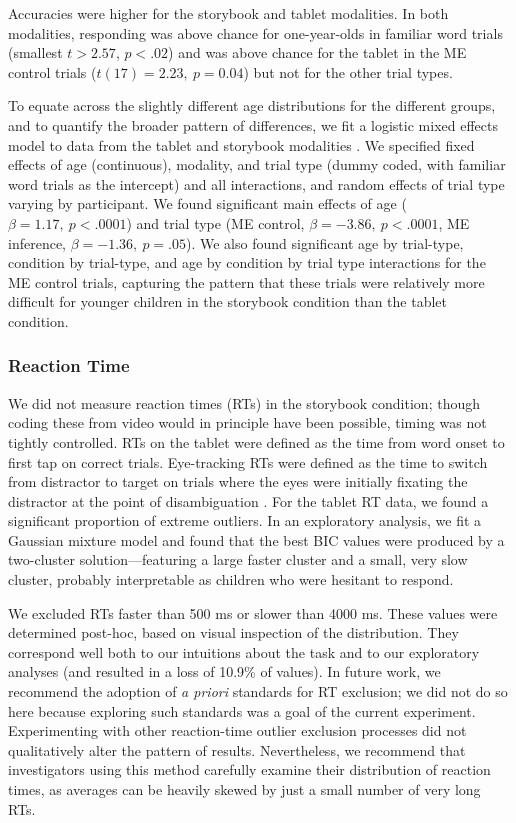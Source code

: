 \documentclass[man,noapacite]{apa2}
\begin{document}
Accuracies were higher for the storybook and tablet modalities. In both modalities, responding was above chance for one-year-olds in familiar word trials (smallest $t > 2.57$, $p < .02$) and was above chance for the tablet in the ME control trials ($t(17) = 2.23,~p = 0.04$) but not for the other trial types. 

To equate across the slightly different age distributions for the different groups, and to quantify the broader pattern of differences, we fit a logistic mixed effects model to data from the tablet and storybook modalities \cite{jaeger2008}. We specified fixed effects of age (continuous), modality, and trial type (dummy coded, with familiar word trials as the intercept) and all interactions, and random effects of trial type varying by participant. We found significant main effects of age ($\beta = 1.17,~p < .0001$) and trial type (ME control, $\beta = -3.86,~p <.0001$, ME inference, $\beta = -1.36,~p = .05$). We also found significant age by trial-type, condition by trial-type, and age by condition by trial type interactions for the ME control trials, capturing the pattern that these trials were relatively more difficult for younger children in the storybook condition than the tablet condition.

\subsubsection{Reaction Time}

We did not measure reaction times (RTs) in the storybook condition; though coding these from video would in principle have been possible, timing was not tightly controlled. RTs on the tablet were defined as the time from word onset to first tap on correct trials. Eye-tracking RTs were defined as the time to switch from distractor to target on trials where the eyes were initially fixating the distractor at the point of disambiguation \cite<for more details, see>{fernald2008}. For the tablet RT data, we found a significant proportion of extreme outliers. In an exploratory analysis, we fit a Gaussian mixture model and found that the best BIC values were produced by a two-cluster solution---featuring a large faster cluster and a small, very slow cluster, probably interpretable as children who were hesitant to respond.

We excluded RTs faster than 500 ms or slower than 4000 ms. These values were determined post-hoc, based on visual inspection of the distribution. They correspond well both to our intuitions about the task and to our exploratory analyses (and resulted in a loss of 10.9\% of values). In future work, we recommend the adoption of {\it a priori} standards for RT exclusion; we did not do so here because exploring such standards was a goal of the current experiment. Experimenting with other reaction-time outlier exclusion processes did not qualitatively alter the pattern of results. Nevertheless, we recommend that investigators using this method carefully examine their distribution of reaction times, as averages can be heavily skewed by just a small number of very long RTs.
\end{document}
